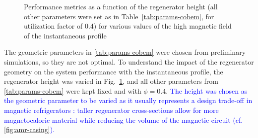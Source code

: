 \documentclass[referee]{svjour3}
\begin{document}
\begin{figure}[!ht]
  \centering
\quad
  \caption{Performance metrics as a function of the regenerator height (all other parameters were set as in Table~\ref{tab:params-cobem}, for utilization factor of 0.4) for various values of the high magnetic field of the instantaneous profile}
\label{fig:Qc_H_inst}
\end{figure}


The geometric parameters in \autoref{tab:params-cobem} were chosen from preliminary simulations, so they are not  optimal. To understand the impact of the regenerator geometry on the system performance with the instantaneous profile, the regenerator height was varied in Fig.~\ref{fig:Qc_H_inst}, and all other parameters from \autoref{tab:params-cobem} were kept fixed and with $\phi=0.4$. \textcolor{blue}{The height was chosen as the geometric parameter to be varied as it usually represents a design trade-off in magnetic refrigerators \cite{bib:fortkamp20-desig}: taller regenerator cross-sections allow for more magnetocaloric material while reducing the volume of the magnetic circuit (cf. \autoref{fig:amr-casing}).}
\end{document}
